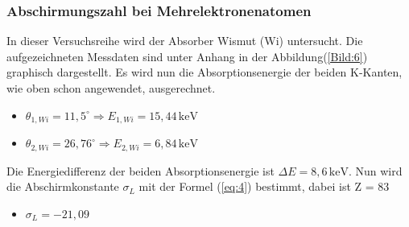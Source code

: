 \subsubsection{Abschirmungszahl bei Mehrelektronenatomen}
In dieser Versuchsreihe wird der Absorber Wismut (Wi) untersucht.
Die aufgezeichneten Messdaten sind unter Anhang in der Abbildung(\ref{Bild:6}) graphisch dargestellt.
Es wird nun die Absorptionsenergie der beiden K-Kanten, wie oben schon angewendet, ausgerechnet.
\begin{itemize}
  \item $\theta_{1,Wi} = 11,5^\circ \Rightarrow E_{1,Wi} = 15,44 \,\text{keV}$
  \item $\theta_{2,Wi} = 26,76^\circ \Rightarrow E_{2,Wi} = 6,84 \,\text{keV}$
\end{itemize}
Die Energiedifferenz der beiden Absorptionsenergie ist $\Delta E = 8,6 \,\text{keV}$.
Nun wird die Abschirmkonstante $\sigma_L$ mit der Formel (\ref{eq:4}) bestimmt, dabei ist Z = 83
\begin{itemize}
  \item $\sigma_L = -21,09$
\end{itemize}
